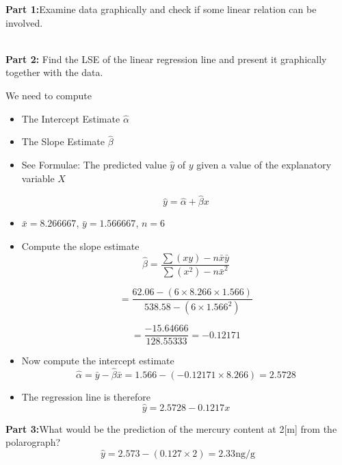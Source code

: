 \noindent\textbf{Part 1:}Examine data graphically and check if some linear relation can be involved.

\\
\bigskip
\noindent\textbf{Part 2: }Find the LSE of the linear regression line and present it graphically together with the data.

We need to compute

\begin{itemize}
	
	\item The Intercept Estimate $\hat{\alpha}$
	
	\item The Slope Estimate $\hat{\beta}$
	
	\item See Formulae: The predicted value $\hat{y} $ of $y$ given a value of the explanatory variable $X$
	
	\[\hat{y} = \hat{\alpha} + \hat{\beta}x \]
	
	
	
	\item  $\bar{x} = 8.266667$, $\bar{y} = 1.566667$, $n =6$
	
	\item Compute the slope estimate
	\[\hat{\beta} =  \frac{\sum(xy) - n\bar{x} \bar{y} }{\sum(x^2) - n\bar{x}^2 }\]
	
	\[= \frac{62.06 - (6 \times 8.266 \times 1.566) }{538.58  - (6 \times 1.566^2) }\]
	
	\[= \frac{-15.64666}{128.55333} = -0.12171\]
	
	
	\item Now compute the intercept estimate \[ \hat{\alpha} = \bar{y} - \hat{\beta}\bar{x} = 1.566-(-0.12171 \times 8.266) = 2.5728\]
	\item The regression line is therefore \[\hat{y} = 2.5728 - 0.1217x \]
\end{itemize}




\noindent\textbf{Part 3:}What would be the prediction of the mercury content at 2[m] from the polarograph?
\bigskip
\[ \hat{y} = 2.573 - (0.127 \times 2) = 2.33 \mbox{ng/g}  \]

